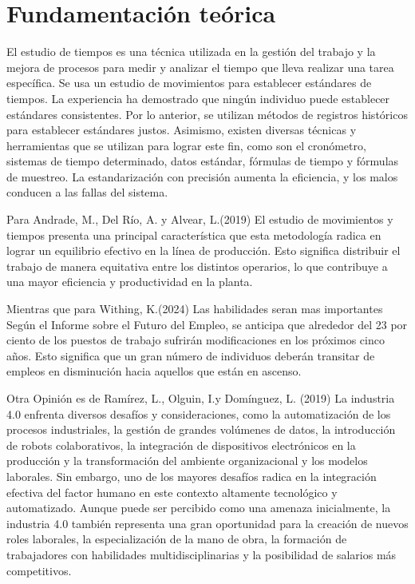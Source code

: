     \section{Fundamentación teórica}
    El estudio de tiempos es una técnica utilizada en la gestión del
    trabajo y la mejora de procesos para medir y analizar el tiempo que
    lleva realizar una tarea específica. Se usa un estudio de movimientos
    para establecer estándares de tiempos. La experiencia ha demostrado
    que ningún individuo puede establecer estándares consistentes.
    Por lo anterior, se utilizan métodos de registros históricos para
    establecer estándares justos. Asimismo, existen diversas técnicas y
    herramientas que se utilizan para lograr este fin, como son el
    cronómetro, sistemas de tiempo determinado, datos estándar,
    fórmulas de tiempo y fórmulas de muestreo. La estandarización con
    precisión aumenta la eficiencia, y los malos conducen a las fallas del
    sistema.
    
    Para Andrade, M., Del Río, A. y Alvear, L.(2019) El estudio de movimientos y tiempos presenta una principal característica que esta metodología radica en lograr un equilibrio efectivo en la línea de producción. Esto significa distribuir el trabajo de manera equitativa entre los distintos operarios, lo que contribuye a una mayor eficiencia y productividad en la planta.\cite{REF7}
    
    Mientras que para Withing, K.(2024) 
    Las habilidades seran mas importantes Según el Informe sobre el Futuro del Empleo, se anticipa que alrededor del 23 por ciento de los puestos de trabajo sufrirán modificaciones en los próximos cinco años. Esto significa que un gran número de individuos deberán transitar de empleos en disminución hacia aquellos que están en ascenso.\cite{REF8}
    
    Otra Opinión es de Ramírez, L., Olguin, I.y Domínguez, L. (2019) La industria 4.0 enfrenta diversos desafíos y consideraciones, como la automatización de los procesos industriales, la gestión de grandes volúmenes de datos, la introducción de robots colaborativos, la integración de dispositivos electrónicos en la producción y la transformación del ambiente organizacional y los modelos laborales. Sin embargo, uno de los mayores desafíos radica en la integración efectiva del factor humano en este contexto altamente tecnológico y automatizado. Aunque puede ser percibido como una amenaza inicialmente, la industria 4.0 también representa una gran oportunidad para la creación de nuevos roles laborales, la especialización de la mano de obra, la formación de trabajadores con habilidades multidisciplinarias y la posibilidad de salarios más competitivos.\cite{REF9}
    
